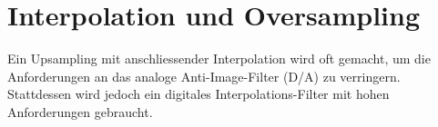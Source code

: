 % 
% 
% 
% 
%

\section{Interpolation und Oversampling}
	\begin{goal}
	  Ein Upsampling mit anschliessender Interpolation wird oft gemacht, um die Anforderungen an das analoge Anti-Image-Filter (D/A) zu verringern. Stattdessen wird jedoch ein digitales Interpolations-Filter mit hohen Anforderungen gebraucht.
	\end{goal}

